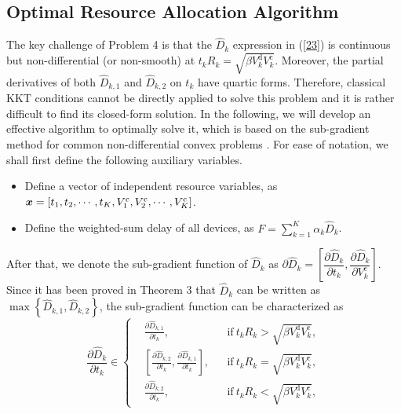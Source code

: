 \documentclass[journal,draftcls,onecolumn,12pt,twoside]{IEEEtran}
\newcommand{\bm}[1]{\mbox{\boldmath{$#1$}}}
\begin{document}
\subsection{Optimal Resource Allocation Algorithm}
The key challenge of Problem 4 is that the $\widehat{D}_k$ expression in (\ref{23}) is continuous but non-differential (or non-smooth) at $t_k R_k = \sqrt{\beta V_k^{\text{d}} V_k^{\text{c}}}$. Moreover, the partial derivatives of both $\widehat{D}_{k,1}$ and $\widehat{D}_{k,2}$ on $t_k$ have quartic forms. Therefore, classical KKT conditions cannot be directly applied to solve this problem and it is rather difficult to find its closed-form solution. In the following, we will develop an effective algorithm to optimally solve it, which is based on the sub-gradient method for common non-differential convex problems \cite{Convex_Optimization_II}. For ease of notation, we shall first define the following auxiliary variables.
\begin{itemize}
	\item Define a vector of independent resource variables, as ${\bm{x}} = \left[t_1,t_2,\cdots,t_K,V^{\text{c}}_1,V^{\text{c}}_2,\cdots,V^{\text{c}}_K\right]$.
	\item Define the weighted-sum delay of all devices, as $F = \sum_{k=1}^{K}\alpha_k\widehat{D}_k$.
\end{itemize}
After that, we denote the sub-gradient function of $\widehat{D}_k$ as $\partial \widehat{D}_k=\left[\dfrac{\partial \widehat{D}_k}{\partial t_k},\dfrac{\partial \widehat{D}_k}{\partial V_k^{\text{c}}}  \right]$. Since it has been proved in Theorem 3 that $\widehat{D}_k$ can be written as $\max \left\{\widehat{D}_{k,1}, \widehat{D}_{k,2} \right\}$, the sub-gradient function  can be characterized as
\begin{equation}
    \dfrac{\partial \widehat{D}_k}{\partial t_k} \in
    \left\{
    \begin{aligned}
        & \frac{\partial \widehat{D}_{k,1}}{\partial t_k},
            & &\text{if}~t_k R_k > \sqrt{\beta V_k^{\text{d}} V_k^{\text{c}}}, \\
        & \left[\frac{\partial \widehat{D}_{k,2}}{\partial t_k}, \frac{\partial \widehat{D}_{k,1}}{\partial t_k}\right],
            & &\text{if}~t_k R_k = \sqrt{\beta V_k^{\text{d}} V_k^{\text{c}}}, \\
        & \frac{\partial \widehat{D}_{k,2}}{\partial t_k},
            & &\text{if}~t_k R_k < \sqrt{\beta V_k^{\text{d}} V_k^{\text{c}}},
	\end{aligned}
    \right. \label{25}
\end{equation}
\end{document}
